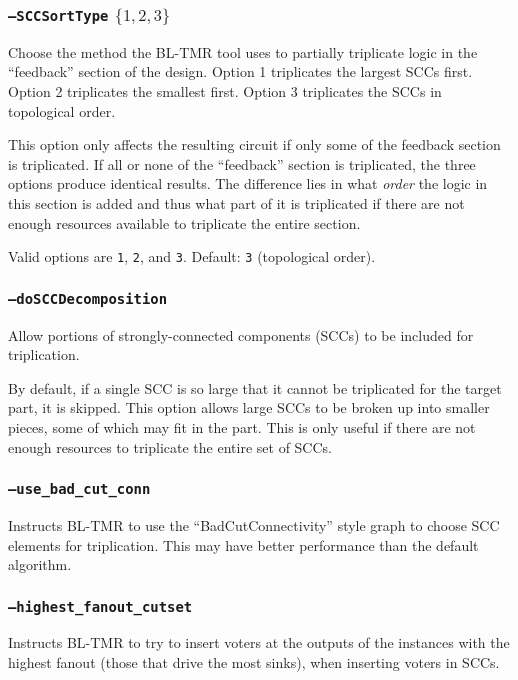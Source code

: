 \documentclass[english]{article}
\begin{document}
\subsubsection{\texttt{--SCCSortType} $\{1,2,3\}$}
Choose the method the BL-TMR tool uses to partially triplicate logic in the 
``feedback'' section of the design.  Option 1 triplicates the largest SCCs 
first. Option 2 triplicates the smallest first. Option 3 triplicates the SCCs 
in topological order.

This option only affects the resulting circuit if only some of the feedback 
section is triplicated. If all or none of the ``feedback'' section is 
triplicated, the three options produce identical results. The difference lies 
in what \emph{order} the logic in this section is added and thus what part of 
it is triplicated if there are not enough resources available to triplicate the 
entire section.

Valid options are \texttt{1}, \texttt{2}, and \texttt{3}. Default: \texttt{3}
(topological order).

\subsubsection{\texttt{--doSCCDecomposition}}
Allow portions of strongly-connected components (SCCs) to be included for 
triplication. 

By default, if a single SCC is so large that it cannot be triplicated for the 
target part, it is skipped. This option allows large SCCs to be broken up into 
smaller pieces, some of which may fit in the part. This is only useful if there 
are not enough resources to triplicate the entire set of SCCs.


\subsubsection{\texttt{--use\_bad\_cut\_conn}}
Instructs BL-TMR to use the ``BadCutConnectivity'' style graph to choose
SCC elements for triplication. This may have better performance than the 
default algorithm.

\subsubsection{\texttt{--highest\_fanout\_cutset}}
Instructs BL-TMR to try to insert voters at the outputs of the instances with 
the highest fanout (those that drive the most sinks), when inserting voters 
in SCCs.
\end{document}
